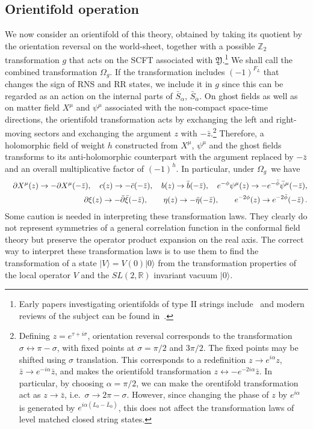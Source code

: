 \documentclass[12pt,a4paper]{article}
\newcommand{\ben}{\begin{eqnarray}\displaystyle}
\newcommand{\een}{\end{eqnarray}}
\newcommand{\IR}{\mathds{R}}
\newcommand{\IZ}{\mathds{Z}}
\newcommand{\p}{\partial}
\newcommand{\I}{\mathrm{i}}
\newcommand{\non}{\nonumber}
\def\bz{\bar z}
\newcommand{\dalpha}{\beta}
\def\CY{\mathfrak{Y}}
\def\dalpha{{\dot\alpha}}
\def\I{i}
\newcommand{\oo}{{$\Omega_g$}}
\begin{document}
\subsection{Orientifold operation}
\label{subsec-orientifold}

We now consider an orientifold of this theory, obtained by taking its quotient by the
orientation reversal on the world-sheet, together with a possible $\IZ_2$ transformation $g$
that acts on the SCFT associated with $\CY$.\footnote{Early papers investigating orientifolds of type II strings include~\cite{Sagnotti:1987tw,Polchinski:1987tu,Pradisi:1988xd,Horava:1989vt} and modern reviews of the subject can be found in~\cite{Angelantonj:2002ct,Blumenhagen:2006ci}.} We shall call the combined transformation \oo.
If the transformation includes $(-1)^{F_L}$ that changes the sign of RNS and RR states,
we include it in $g$ since this can be regarded as an action on the internal parts of $\bar S_\alpha$, $\bar S_\dalpha$.
On ghost fields as well as on matter field $X^\mu$ and $\psi^\mu$ associated with the non-compact
space-time directions, the orientifold transformation
acts by exchanging the left and right-moving sectors and exchanging the
argument $z$ with $-\bz$.\footnote{Defining $z=e^{\tau+i\sigma}$, orientation reversal corresponds to the
transformation $\sigma\leftrightarrow
\pi-\sigma$, with fixed points at $\sigma=\pi/2$ and $3\pi/2$. The
fixed points may be shifted using $\sigma$ translation. This corresponds to a redefinition
$z\to e^{i\alpha}z$, $\bz\to e^{-i\alpha}\bar z$, and makes the orientifold transformation
$z\leftrightarrow -e^{-2\I\alpha}\bz$. In particular, by choosing $\alpha=\pi/2$, we can make
the orentifold transformation act as $z\to \bz$, i.e.\ $\sigma\to 2\pi-\sigma$.
However, since changing the phase of $z$ by $e^{i\alpha}$
is generated by $e^{i\alpha(L_0-\bar L_0)}$, this does not affect the transformation
laws of level matched
closed string states.}
Therefore, a holomorphic field of weight $h$ constructed from $X^\mu$, $\psi^\mu$
and the ghost fields transforms to its
anti-holomorphic counterpart with the argument replaced by $-\bz$ and an
overall multiplicative factor
of $(-1)^h$. In particular, under \oo\ we have
\ben \label{eortr}
&& \p X^\mu (z)\to - \p X^\mu(-\bz), \quad c(z)\to -\bar c(-\bz), \quad
b(z)\to \bar b(-\bz), \quad e^{-\phi}\psi^\mu(z)\to -e^{-\bar\phi}\bar\psi^\mu(-\bz),
\non\\
&&
\p\xi(z)\to -\bar\p\bar\xi(-\bz), \qquad \eta(z)\to -\bar\eta(-\bz),
\qquad e^{-2\phi}(z)\to e^{-2\bar\phi}(-\bz)\, .
\een
Some caution is needed in interpreting these transformation laws. They clearly do not
represent symmetries of a general correlation function in the conformal field theory but
preserve the operator product expansion on the real axis. The
correct way to interpret these transformation laws is to use them to find the transformation
of a state $|V\rangle=V(0)|0\rangle$ from the transformation properties of the local
operator $V$ and the $SL(2,\IR)$ invariant vacuum $|0\rangle$.
\end{document}
